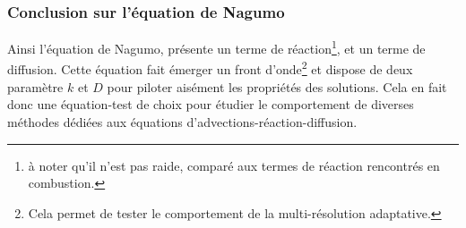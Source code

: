 \subsubsection{Conclusion sur l'équation de Nagumo}
Ainsi l'équation de Nagumo, présente un terme de réaction\footnote{à noter qu'il n'est pas raide, comparé aux termes de réaction rencontrés en combustion.},
et un terme de diffusion. Cette équation fait émerger un front d'onde\footnote{Cela permet de tester le comportement de la multi-résolution adaptative.} et dispose de deux paramètre $k$ et $D$ pour piloter aisément les propriétés des solutions.
Cela en fait donc une équation-test de choix pour étudier le comportement de diverses méthodes dédiées aux équations d'advections-réaction-diffusion. 
